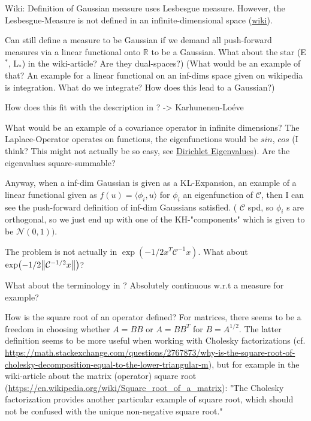 \documentclass[11pt]{article}
\newcommand{\C}{{\mathcal{C}}}
\newcommand{\R}{{\mathbb{R}}}
\newcommand{\N}[2]{\mathcal{N}\left(#1,#2\right)}
\begin{document}
Wiki: Definition of Gaussian measure uses Lesbesgue measure.
However, the Lesbesgue-Measure is not defined in an infinite-dimensional space (\href{https://en.wikipedia.org/wiki/Infinite-dimensional\_Lebesgue\_measure}{wiki}).

Can still define a measure to be Gaussian if we demand all push-forward measures via a
linear functional onto \(\R\) to be a Gaussian. What about the star (E\(^{\text{*}}\), L\(_{\text{*}}\))
in the wiki-article? Are they dual-spaces?) (What would be an example of that? An example
for a linear functional on an inf-dims space given on wikipedia is integration.
What do we integrate? How does this lead to a Gaussian?)

How does this fit with the description in \cite{cotter_mcmc_2013}? -> Karhunenen-Loéve

What would be an example of a covariance operator in infinite dimensions?
The Laplace-Operator operates on functions, the eigenfunctions would be \(sin\), \(cos\) (I think?
This might not actually be so easy, see \href{https://en.wikipedia.org/wiki/Dirichlet\_eigenvalue}{Dirichlet Eigenvalues}). Are the eigenvalues
square-summable?

Anyway, when a inf-dim Gaussian is given as a KL-Expansion, an  example of a linear functional
given as \(f(u) = \langle \phi_i, u \rangle\) for \(\phi_i\) an eigenfunction of \(\C\), then I can see
the push-forward definition of inf-dim Gaussians satisfied. ( \(\C\) spd, so \(\phi_i\) s are
orthogonal, so we just end up with one of the KH-"components" which is given to be \(\N{0}{1})\).

The problem is not actually in \(\exp(-1/2x^T\C^{-1}x)\). What about \(\exp(-1/2\norm{\C^{-1/2}x})\)?

What about the terminology in \cite{cotter_mcmc_2013}? Absolutely continuous w.r.t a measure for
example?

How is the square root of an operator defined? For matrices, there seems to be a freedom in
choosing whether \(A = BB\) or \(A = BB^T\) for \(B = A^{1/2}\). The latter definition seems to
be more useful when working with Cholesky factorizations (cf. \url{https://math.stackexchange.com/questions/2767873/why-is-the-square-root-of-cholesky-decomposition-equal-to-the-lower-triangular-m}),
but for example in the wiki-article about the matrix (operator) square root (\url{https://en.wikipedia.org/wiki/Square\_root\_of\_a\_matrix}):
"The Cholesky factorization provides another particular example of square root, which should not be confused with the unique non-negative square root."
\end{document}

